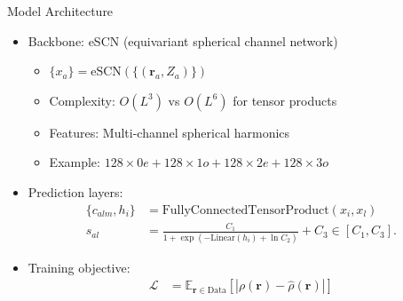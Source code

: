 \begin{frame}{Model Architecture}
    \begin{itemize}
        \item Backbone: eSCN (equivariant spherical channel network)
        \begin{itemize}
            \item $\{x_a\} = \text{eSCN}(\{(\mathbf{r}_a, Z_a)\})$
            \item Complexity: $O(L^3)$ vs $O(L^6)$ for tensor products
            \item Features: Multi-channel spherical harmonics
            \item Example: $128\times0e + 128\times1o + 128\times2e + 128\times3o$
        \end{itemize}
        \item Prediction layers:
        \begin{align*}
            \{c_{alm}, h_i\} &= \text{FullyConnectedTensorProduct}(x_i, x_l) \\
            s_{al} &= \frac{C_1}{1 + \exp(-\text{Linear}(h_i) + \ln C_2)} + C_3
            \in [C_1, C_3].
        \end{align*}
        \item Training objective:
        \begin{align*}
            \mathcal{L} &= \mathbb{E}_{\mathbf{r}\in\text{Data}}[|\rho(\mathbf{r}) - \hat{\rho}(\mathbf{r})|]
        \end{align*}
    \end{itemize}
\end{frame}




